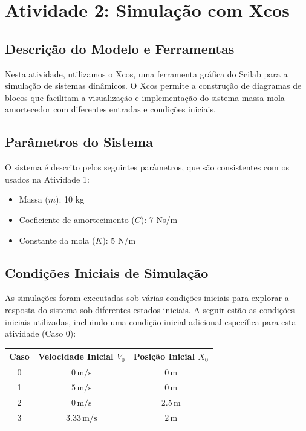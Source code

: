 \section{Atividade 2: Simulação com Xcos}
\subsection{Descrição do Modelo e Ferramentas}
Nesta atividade, utilizamos o Xcos, uma ferramenta gráfica do Scilab para a simulação de sistemas dinâmicos. O Xcos permite a construção de diagramas de blocos que facilitam a visualização e implementação do sistema massa-mola-amortecedor com diferentes entradas e condições iniciais.

\subsection{Parâmetros do Sistema}
O sistema é descrito pelos seguintes parâmetros, que são consistentes com os usados na Atividade 1:
\begin{itemize}
    \item Massa (\( m \)): 10 kg
    \item Coeficiente de amortecimento (\( C \)): 7 Ns/m
    \item Constante da mola (\( K \)): 5 N/m
\end{itemize}

\subsection{Condições Iniciais de Simulação}
As simulações foram executadas sob várias condições iniciais para explorar a resposta do sistema sob diferentes estados iniciais. A seguir estão as condições iniciais utilizadas, incluindo uma condição inicial adicional específica para esta atividade (Caso 0):

\begin{center}
    \begin{tabular}{|c|c|c|}
        \hline
        \textbf{Caso} & \textbf{Velocidade Inicial \( V_0 \)} & \textbf{Posição Inicial \( X_0 \)} \\
        \hline
        0             & \( 0 \, \text{m/s} \)                 & \( 0 \, \text{m} \)                \\
        1             & \( 5 \, \text{m/s} \)                 & \( 0 \, \text{m} \)                \\
        2             & \( 0 \, \text{m/s} \)                 & \( 2.5 \, \text{m} \)              \\
        3             & \( 3.33 \, \text{m/s} \)              & \( 2 \, \text{m} \)                \\
        \hline
    \end{tabular}
\end{center}

